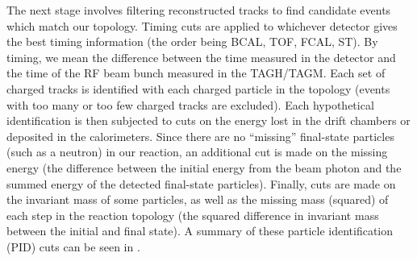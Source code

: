 The next stage involves filtering reconstructed tracks to find candidate events which match our topology. Timing cuts are applied to whichever detector gives the best timing information (the order being BCAL, TOF, FCAL, ST). By timing, we mean the difference between the time measured in the detector and the time of the RF beam bunch measured in the TAGH/TAGM. Each set of charged tracks is identified with each charged particle in the topology (events with too many or too few charged tracks are excluded). Each hypothetical identification is then subjected to cuts on the energy lost in the drift chambers or deposited in the calorimeters. Since there are no ``missing'' final-state particles (such as a neutron) in our reaction, an additional cut is made on the missing energy (the difference between the initial energy from the beam photon and the summed energy of the detected final-state particles). Finally, cuts are made on the invariant mass of some particles, as well as the missing mass (squared) of each step in the reaction topology (the squared difference in invariant mass between the initial and final state). A summary of these particle identification (PID) cuts can be seen in .

